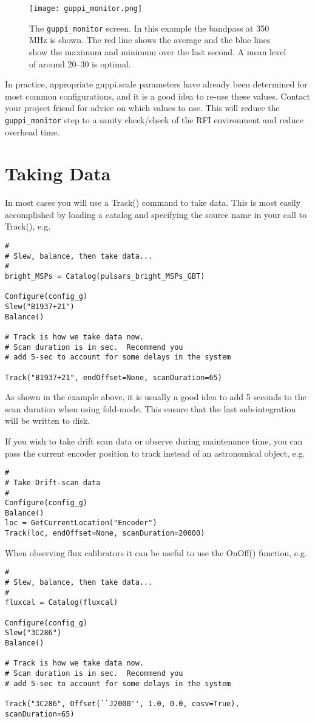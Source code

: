 \begin{figure}
\texttt{[image: guppi\_monitor.png]}
\caption[The GUPPI monitor display]{The \texttt{guppi\_monitor}
  screen. In this example the bandpass at 350 MHz is shown.  The red
  line shows the average and the blue lines show the maximum and
  minimum over the last second.  A mean level of around 20--30 is
  optimal.  \label{fig:gupstat}}
\label{fig:guppistatus}
\end{figure}

In practice, appropriate guppi.scale parameters have already been
determined for most common configurations, and it is a good idea to
re-use these values.  Contact your project friend for advice on which
values to use.  This will reduce the \texttt{guppi\_monitor} step to a
sanity check/check of the RFI environment and reduce overhead time.

\section{Taking Data}
\label{sec:data}

In most cases you will use a Track() command to take data.  This is
most easily accomplished by loading a catalog and specifying the
source name in your call to Track(), e.g.
\begin{lstlisting}
#
# Slew, balance, then take data...
#
bright_MSPs = Catalog(pulsars_bright_MSPs_GBT)

Configure(config_g)
Slew("B1937+21")
Balance()

# Track is how we take data now.
# Scan duration is in sec.  Recommend you
# add 5-sec to account for some delays in the system

Track("B1937+21", endOffset=None, scanDuration=65)
\end{lstlisting}
As shown in the example above, it is usually a good idea to add 5
seconds to the scan duration when using fold-mode.  This ensure that
the last sub-integration will be written to disk.

If you wish to take drift scan data or observe during maintenance
time, you can pass the current encoder position to track instead of an
astronomical object, e.g.
\begin{lstlisting}
#
# Take Drift-scan data
#
Configure(config_g)
Balance()
loc = GetCurrentLocation("Encoder")
Track(loc, endOffset=None, scanDuration=20000)
\end{lstlisting}

When observing flux calibrators it can be useful to use the OnOff()
function, e.g.
\begin{lstlisting}
#
# Slew, balance, then take data...
#
fluxcal = Catalog(fluxcal)

Configure(config_g)
Slew("3C286")
Balance()

# Track is how we take data now.
# Scan duration is in sec.  Recommend you
# add 5-sec to account for some delays in the system

Track("3C286", Offset(``J2000'', 1.0, 0.0, cosv=True), scanDuration=65)
\end{lstlisting}

